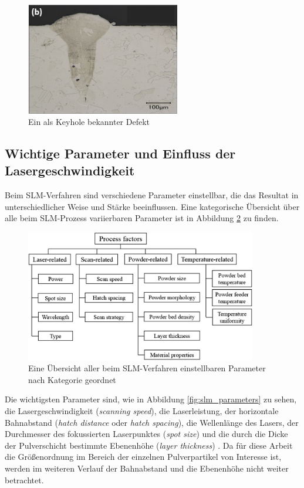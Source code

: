 		\begin{figure}[!ht]
			\centering
			\includegraphics[width=0.6\textwidth]{chapter/main/img/defects/keyhole.png}
			\caption{Ein als Keyhole bekannter Defekt \cite{eskandarisabzi2019defect}}
			\label{fig:defects_keyholes}
		\end{figure}

	\subsection{Wichtige Parameter und Einfluss der Lasergeschwindigkeit}
		Beim SLM-Verfahren sind verschiedene Parameter einstellbar, die das Resultat in
		unterschiedlicher Weise und Stärke beeinflussen. Eine kategorische Übersicht über alle
		beim SLM-Prozess variierbaren Parameter ist in Abbildung \ref{fig:scheme_parameters} zu
		finden.

		\begin{figure}[!ht]
			\centering
			\includegraphics[width=0.9\textwidth]{chapter/main/img/scheme_parameters_2.png}
			\caption{Eine Übersicht aller beim SLM-Verfahren einstellbaren Parameter nach
			Kategorie geordnet \cite{zhang2017defect,aboulkhair2014reducing}}
			\label{fig:scheme_parameters}
		\end{figure}

		Die wichtigsten Parameter sind, wie in Abbildung \ref{fig:slm_parameters} zu sehen, die
		Lasergeschwindigkeit (\emph{scanning speed}), die Laserleistung, der horizontale
		Bahnabstand (\emph{hatch distance} oder \emph{hatch spacing}), die Wellenlänge des Lasers,
		der Durchmesser des fokussierten Laserpunktes (\emph{spot size}) und die durch die Dicke
		der Pulverschicht bestimmte Ebenenhöhe (\emph{layer thickness})
		\cite{sadali2020influence}. Da für diese Arbeit die Größenordnung im Bereich der einzelnen
		Pulverpartikel von Interesse ist, werden im weiteren Verlauf der Bahnabstand und die
		Ebenenhöhe nicht weiter betrachtet.

